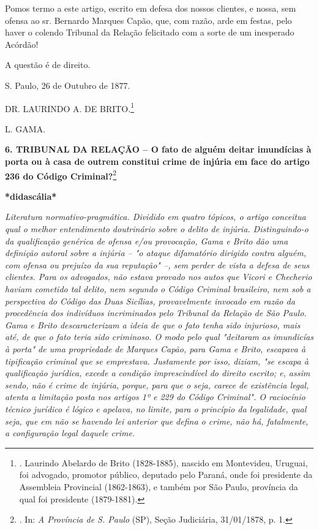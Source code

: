 Pomos termo a este artigo, escrito em defesa dos nossos clientes, e
nossa, sem ofensa ao sr. Bernardo Marques Capão, que, com razão, arde em
festas, pelo haver o colendo Tribunal da Relação felicitado com a sorte
de um inesperado Acórdão!

A questão é de direito.

S. Paulo, 26 de Outubro de 1877.

DR. LAURINDO A. DE BRITO.\footnote{. Laurindo Abelardo de Brito
  (1828-1885), nascido em Montevideu, Uruguai, foi advogado, promotor
  público, deputado pelo Paraná, onde foi presidente da Assembleia
  Provincial (1862-1863), e também por São Paulo, província da qual foi
  presidente (1879-1881).}

\protect\hypertarget{Secao_Sem_Titulo-8}{}{}L. GAMA.

\textbf{6. TRIBUNAL DA RELAÇÃO -- O fato de alguém deitar imundícias à
porta ou à casa de outrem constitui crime de injúria em face do artigo
236 do Código Criminal?}\footnote{. In: \emph{A Província de S. Paulo}
  (SP), Seção Judiciária, 31/01/1878, p. 1.}

\textbf{*didascália*}

\emph{Literatura normativo-pragmática. Dividido em quatro tópicos, o
artigo conceitua qual o melhor entendimento doutrinário sobre o delito
de injúria. Distinguindo-o da qualificação genérica de ofensa e/ou
provocação, Gama e Brito dão uma definição autoral sobre a injúria -- "o
ataque difamatório dirigido contra alguém, com ofensa ou prejuízo da sua
reputação" --, sem perder de vista a defesa de seus clientes. Para os
advogados, não estava provado nos autos que Vicori e Checherio haviam
cometido tal delito, nem segundo o Código Criminal brasileiro, nem sob a
perspectiva do Código das Duas Sicílias, provavelmente invocado em razão
da procedência dos indivíduos incriminados pelo Tribunal da Relação de
São Paulo. Gama e Brito descaracterizam a ideia de que o fato tenha sido
injurioso, mais até, de que o fato teria sido criminoso. O modo pelo
qual "deitaram as imundicías à porta" de uma propriedade de Marques
Capão, para Gama e Brito, escapava à tipificação criminal que se
emprestava. Justamente por isso, diziam, "se escapa à qualificação
jurídica, excede a condição imprescindível do direito escrito; e, assim
sendo, não é crime de injúria, porque, para que o seja, carece de
existência legal, atenta a limitação posta nos artigos 1º e 229 do
Código Criminal". O raciocínio técnico jurídico é lógico e apelava, no
limite, para o princípio da legalidade, qual seja, que em não se havendo
lei anterior que defina o crime, não há, fatalmente, a configuração
legal daquele crime. }

